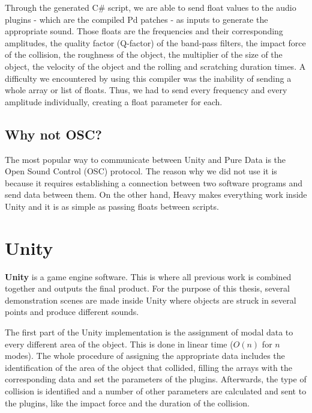 Through the generated C\# script, we are able to send float values to the audio plugins - which are the compiled Pd patches - as inputs to generate the appropriate sound. Those floats are the frequencies and their corresponding amplitudes, the quality factor (Q-factor) of the band-pass filters, the impact force of the collision, the roughness of the object, the multiplier of the size of the object, the velocity of the object and the rolling and scratching duration times. A difficulty we encountered by using this compiler was the inability of sending a whole array or list of floats. Thus, we had to send every frequency and every amplitude individually, creating a float parameter for each.
 
\subsection{Why not OSC?}
The most popular way to communicate between Unity\textsuperscript{\textregistered} and Pure Data is the Open Sound Control (OSC) protocol. The reason why we did not use it is because it requires establishing a connection between two software programs and send data between them. On the other hand, Heavy makes everything work inside Unity\textsuperscript{\textregistered} and it is as simple as passing floats between scripts. 

\section{Unity\textsuperscript{\textregistered}}
\textbf{Unity\textsuperscript{\textregistered}} is a game engine software. This is where all previous work is combined together and outputs the final product. For the purpose of this thesis, several demonstration scenes are made inside Unity\textsuperscript{\textregistered} where objects are struck in several points and produce different sounds. 

The first part of the Unity\textsuperscript{\textregistered} implementation is the assignment of modal data to every different area of the object. This is done in linear time ($O(n)$ for $n$ modes). The whole procedure of assigning the appropriate data includes the identification of the area of the object that collided, filling the arrays with the corresponding data and set the parameters of the plugins. Afterwards, the type of collision is identified and a number of other parameters are calculated and sent to the plugins, like the impact force and the duration of the collision.

